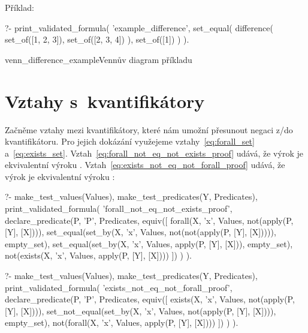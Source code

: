 Příklad:

\begin{prolog}
?-	print_validated_formula(
		'example_difference',
		set_equal(
			difference(
				set_of([1, 2, 3]),
				set_of([2, 3, 4])
			),
			set_of([1])
		)
	).
\end{prolog}

\begin{fig}{venn_difference_example}{Vennův diagram příkladu}
\end{fig}

\section{Vztahy s~kvantifikátory}

Začněme vztahy mezi kvantifikátory, které nám umožní přesunout negaci z/do kvantifikátoru. Pro jejich dokázání využejeme
vztahy~\eqref{eq:forall_set} a~\eqref{eq:exists_set}. Vztah~\eqref{eq:forall_not_eq_not_exists_proof} udává, že výrok  je ekvivalentní výroku . Vztah~\eqref{eq:exists_not_eq_not_forall_proof} udává, že výrok  je ekvivalentní výroku :

\begin{prolog}
?- 	make_test_values(Values),
	make_test_predicates(Y, Predicates),
	print_validated_formula(
		'forall_not_eq_not_exists_proof',
		declare_predicate(P, 'P', Predicates,
			equiv([
				forall(X, 'x', Values, not(apply(P, [Y], [X]))),
				set_equal(set_by(X, 'x', Values, not(not(apply(P, [Y], [X])))), empty_set),
				set_equal(set_by(X, 'x', Values, apply(P, [Y], [X])), empty_set),
				not(exists(X, 'x', Values, apply(P, [Y], [X])))
			])
		)
	).
\end{prolog}

\begin{prolog}
?- 	make_test_values(Values),
	make_test_predicates(Y, Predicates),
	print_validated_formula(
		'exists_not_eq_not_forall_proof',
		declare_predicate(P, 'P', Predicates,
			equiv([
				exists(X, 'x', Values, not(apply(P, [Y], [X]))),
				set_not_equal(set_by(X, 'x', Values, not(apply(P, [Y], [X]))), empty_set),
				not(forall(X, 'x', Values, apply(P, [Y], [X])))
			])
		)
	).
\end{prolog}

